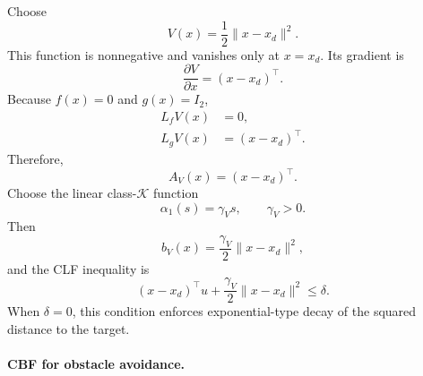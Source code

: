 \documentclass[../../master-handout.tex]{subfiles}
\begin{document}
Choose
\begin{equation}
    V(x)
    =
    \frac{1}{2}\|x-x_d\|^2.
    \label{eq:lec23-example-V}
\end{equation}
This function is nonnegative and vanishes only at $x=x_d$. Its gradient is
\begin{equation}
    \frac{\partial V}{\partial x}
    =
    (x-x_d)^\top.
\end{equation}
Because $f(x)=0$ and $g(x)=I_2$,
\begin{align}
    L_fV(x)&=0,
    \\
    L_gV(x)&=(x-x_d)^\top.
\end{align}
Therefore,
\begin{equation}
    A_V(x)
    =
    (x-x_d)^\top.
    \label{eq:lec23-example-Av}
\end{equation}
Choose the linear class-$\mathcal{K}$ function
\begin{equation}
    \alpha_1(s)=\gamma_Vs,
    \qquad
    \gamma_V>0.
\end{equation}
Then
\begin{equation}
    b_V(x)
    =
    \frac{\gamma_V}{2}\|x-x_d\|^2,
    \label{eq:lec23-example-bv}
\end{equation}
and the CLF inequality is
\begin{equation}
    (x-x_d)^\top u
    +
    \frac{\gamma_V}{2}\|x-x_d\|^2
    \leq
    \delta.
    \label{eq:lec23-example-clf}
\end{equation}
When $\delta=0$, this condition enforces exponential-type decay of the squared distance to the target.

\paragraph{CBF for obstacle avoidance.}
\end{document}
